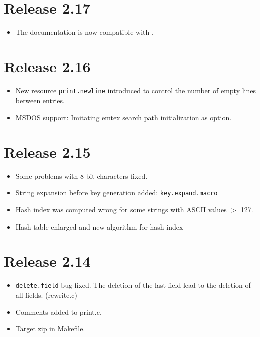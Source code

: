 \documentclass[11pt,a4paper]{scrartcl}
\newcommand\rsc[1]{\texttt{#1}}
\newcommand\File[1]{\textsf{#1}}
\newenvironment{Release}[2]{%
  \def\tmp{#2}%
  \section*{Release #1 \ifx\tmp\empty\else{\normalsize[#2]}\fi}
  \begin{itemize}
}{\end{itemize}}
\newenvironment{Fix}[1]{\item }{}
\newenvironment{New}[1]{\item }{}
\newenvironment{Doc}[1]{\item }{}
\newenvironment{Update}[1]{\item }{}
\begin{document}
\begin{multicols}
 \begin{Release}{2.17}{}
  \begin{Doc}{gene}
    The documentation is now compatible with \LaTeXe.
  \end{Doc}
 \end{Release}

 \begin{Release}{2.16}{}
  \begin{New}{gene}
    New resource \rsc{print.newline} introduced to control the
    number of empty lines between entries.
  \end{New}
  \begin{New}{gene}
    MSDOS support: Imitating emtex search path initialization as
    option.
  \end{New}
 \end{Release}

 \begin{Release}{2.15}{}
  \begin{Fix}{gene}
    Some problems with 8-bit characters fixed.
  \end{Fix}
  \begin{New}{gene}
    String expansion before key generation added:
    \rsc{key.expand.macro}
  \end{New}
  \begin{Fix}{gene}
    Hash index was computed wrong for some strings with ASCII values $>$
    127.
  \end{Fix}
  \begin{Update}{gene}
    Hash table enlarged and new algorithm for hash index
  \end{Update}
 \end{Release}

 \begin{Release}{2.14}{}
  \begin{Fix}{gene}
    \rsc{delete.field} bug fixed. The deletion of the last
    field lead to the deletion of all fields. (\File{rewrite.c})
  \end{Fix}
  \begin{Update}{gene}
    Comments added to \File{print.c}.
  \end{Update}
  \begin{New}{gene}
    Target zip in \File{Makefile}.
  \end{New}
 \end{Release}


\end{multicols}
\end{document}
